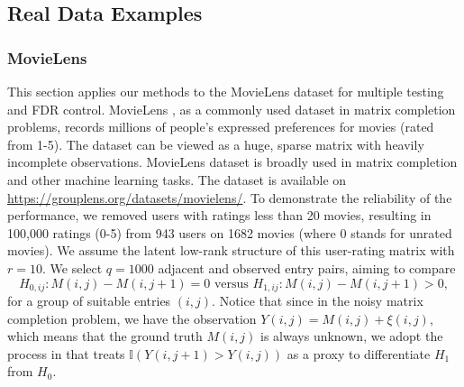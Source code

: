 \documentclass[12pt]{article}
\theoremstyle{plain}
\begin{document}
\begin{sloppypar}
\subsection{Real Data Examples}
\subsubsection{MovieLens}
This section applies our methods to the MovieLens dataset for multiple testing and FDR control. MovieLens \citep{harper2015movielens}, as a commonly used dataset in matrix completion problems, records millions of people’s expressed preferences for movies (rated from 1-5). The dataset can be viewed as a huge, sparse matrix with heavily incomplete observations. MovieLens dataset is broadly used in matrix completion \citep{hastie2015matrix,monti2017geometric,xia2021statistical} and other machine learning tasks. The dataset is available on \url{https://grouplens.org/datasets/movielens/}. To demonstrate the reliability of the performance, we removed users with ratings less than 20 movies, resulting in 100,000 ratings (0-5) from 943 users on 1682 movies (where 0 stands for unrated movies).
We assume the latent low-rank structure of this user-rating matrix with $r=10$. We select $q=1000$ 
adjacent and observed entry pairs, aiming to compare 
\begin{equation*}
    H_{0,ij}: M(i,j)-M(i,j+1)=0 \text{ versus } H_{1,ij}: M(i,j)-M(i,j+1)> 0,
\end{equation*}
for a group of suitable entries $(i,j)$.
 Notice that since in the noisy matrix completion problem, we have the observation $Y(i, j)=M(i, j)+\xi(i, j)$, which means that the ground truth $M(i, j)$ is always unknown, we adopt the process in \cite{xia2021statistical} that treats $\mathbb{I}\left(Y\left(i, j+1\right)>Y\left(i, j\right)\right)$ as a proxy to differentiate $H_1$ from $H_0$. %
 

\end{sloppypar}
\end{document}
